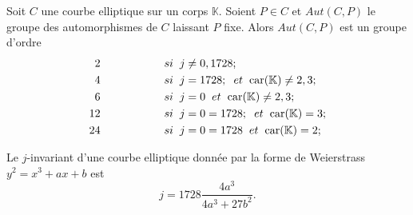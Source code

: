 \documentclass[a4paper]{article}
\begin{document}
\begin{cor}  \label{corol2}
Soit $C$ une courbe elliptique sur un corps $\mathbb{K}$.
Soient $P \in C$ et $Aut(C,P)$ le groupe des automorphismes de $C$ laissant $P$ fixe. 
Alors $Aut(C,P)$ est un groupe d'ordre
\begin{align*}
2  \hspace{2cm} si \hspace{0.2cm} j &\neq 0,1728; \\
4  \hspace{2cm} si \hspace{0.2cm} j &=1728; \hspace{0.2cm} et \hspace{0.2cm} \text{car}(\mathbb{K}) \neq 2,3; \\
6 \hspace{2cm} si \hspace{0.2cm} j &=0 \hspace{0.2cm} et \hspace{0.2cm} \text{car}(\mathbb{K}) \neq 2,3; \\
12 \hspace{2cm} si \hspace{0.2cm} j &=0=1728; \hspace{0.2cm} et \hspace{0.2cm} \text{car}(\mathbb{K}) = 3; \\
24 \hspace{2cm} si \hspace{0.2cm} j &=0=1728 \hspace{0.2cm} et \hspace{0.2cm} \text{car}(\mathbb{K}) = 2; \\
\end{align*}
\end{cor}













\begin{rem}
Le $j$-invariant d'une courbe elliptique donnée par la forme de Weierstrass $y^2=x^3+ax+b$ est
\begin{equation*}
j=1728\frac{4a^3}{4a^3+27b^2}.
\end{equation*}
\end{rem}






\newpage
\end{document}
